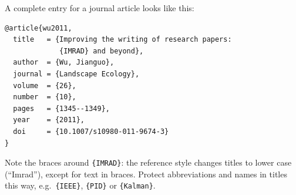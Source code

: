 \begin{instructions}
A complete entry for a journal article looks like this:

\noindent\begin{minipage}{\linewidth}
\begin{verbatim}
@article{wu2011,
  title   = {Improving the writing of research papers:
             {IMRAD} and beyond},
  author  = {Wu, Jianguo},
  journal = {Landscape Ecology},
  volume  = {26},
  number  = {10},
  pages   = {1345--1349},
  year    = {2011},
  doi     = {10.1007/s10980-011-9674-3}
}
\end{verbatim}
\end{minipage}

Note the braces around \texttt{\{IMRAD\}}: the reference style changes titles to lower case (\enquote{Imrad}), except for text in braces. Protect abbreviations and names in titles this way, e.g.\ \texttt{\{IEEE\}}, \texttt{\{PID\}} or \texttt{\{Kalman\}}.
\end{instructions}
\printbibliography[heading=none]
